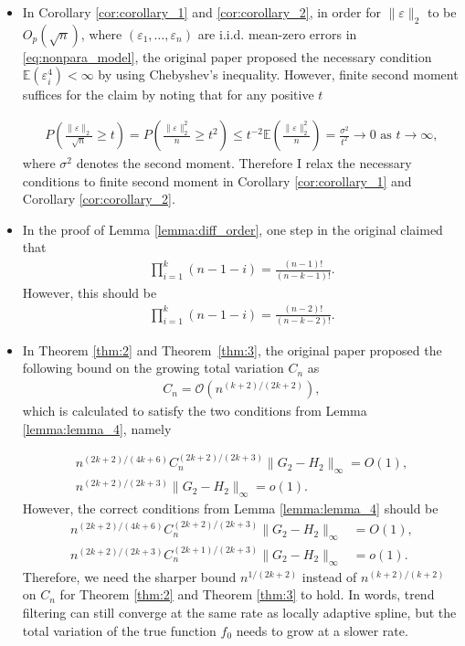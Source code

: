 \documentclass[a4paper]{article}
\renewcommand{\cal}{\mathcal}
\newcommand{\E}{\mathbb{E}}
\begin{document}
\begin{itemize}
\item In Corollary \ref{cor:corollary_1} and \ref{cor:corollary_2}, in order for $\|\varepsilon\|_2$ to be $O_p(\sqrt{n})$, where $(\varepsilon_1,\ldots,\varepsilon_n)$ are i.i.d. mean-zero errors in \eqref{eq:nonpara_model}, the original paper proposed the necessary condition $\E(\varepsilon_i^4)<\infty$ by using Chebyshev's inequality. However, finite second moment suffices for the claim by noting that for any positive $t$

\begin{align*}
P(\frac{\|\varepsilon\|_2}{\sqrt{n}}\geq t) = P(\frac{\|\varepsilon\|_2^2}{n}\geq t^2) \leq t^{-2}\E(\frac{\|\varepsilon\|_2^2}{n}) = \frac{\sigma^2}{t^2} \rightarrow 0 \text{ as } t\rightarrow \infty,
\end{align*}
where $\sigma^2$ denotes the second moment. Therefore I relax the necessary conditions to finite second moment in Corollary \ref{cor:corollary_1} and Corollary \ref{cor:corollary_2}.

\item In the proof of Lemma \ref{lemma:diff_order}, one step in the original claimed that
\begin{align*}
\prod_{i=1}^k (n-1-i) = \frac{(n-1)!}{(n-k-1)!}.
\end{align*}
However, this should be
\begin{align*}
\prod_{i=1}^k (n-1-i) = \frac{(n-2)!}{(n-k-2)!}.
\end{align*}

\item In Theorem \ref{thm:2} and Theorem~\ref{thm:3}, the original paper proposed the following bound on the growing total variation $C_n$ as
\begin{align*}
C_n = \cal{O}(n^{(k+2)/(2k+2)}),
\end{align*}
which is calculated to satisfy the two conditions from Lemma \ref{lemma:lemma_4}, namely

\begin{align*}
n^{(2k+2)/(4k+6)}C_n^{(2k+2)/(2k+3)}\|G_2-H_2\|_\infty = O(1),\\
n^{(2k+2)/(2k+3)}\|G_2-H_2\|_\infty  = o(1).
\end{align*}
However, the correct conditions from Lemma \ref{lemma:lemma_4} should be
\begin{align*}
n^{(2k+2)/(4k+6)}C_n^{(2k+2)/(2k+3)}\|G_2-H_2\|_\infty &= O(1),\\
n^{(2k+2)/(2k+3)}C_n^{(2k+1)/(2k+3)}\|G_2-H_2\|_\infty &= o(1).
\end{align*}
Therefore, we need the sharper bound $n^{1/(2k+2)}$ instead of $n^{(k+2)/(k+2)}$ on $C_n$ for Theorem \ref{thm:2} and Theorem \ref{thm:3} to hold. In words, trend filtering can still converge at the same rate as locally adaptive spline, but the total variation of the true function $f_0$ needs to grow at a slower rate.
\end{itemize}
\end{document}

